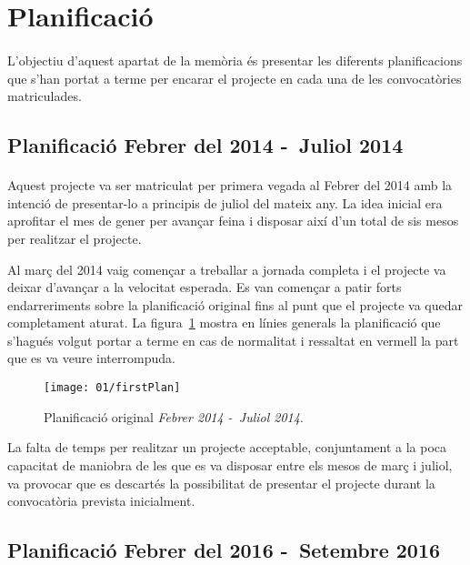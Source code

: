 \section{Planificació}

    \paragraph{}
    L'objectiu d'aquest apartat de la memòria és presentar les diferents planificacions que s'han portat a terme per encarar el projecte en cada una de les convocatòries matriculades.

    \subsection{Planificació Febrer del 2014 -\ Juliol 2014}

        \paragraph{}
        Aquest projecte va ser matriculat per primera vegada al Febrer del 2014 amb la intenció de presentar-lo a principis de juliol del mateix any. La idea inicial era aprofitar el mes de gener per avançar feina i disposar així d’un total de sis mesos per realitzar el projecte.

        Al març del 2014 vaig començar a treballar a jornada completa i el projecte va deixar d’avançar a la velocitat esperada. Es van començar a patir forts endarreriments sobre la planificació original fins al punt que el projecte va quedar completament aturat. La figura~\ref{fig:firstPlan} mostra en línies generals la planificació que s’hagués volgut portar a terme en cas de normalitat i ressaltat en vermell la part que es va veure interrompuda.

        \begin{figure}[h]
                \texttt{[image: 01/firstPlan]}
                \centering
                \caption{Planificació original \emph{Febrer 2014 -\ Juliol 2014}.\label{fig:firstPlan}}
        \end{figure}

        La falta de temps per realitzar un projecte acceptable, conjuntament a la poca capacitat de maniobra de les que es va disposar entre els mesos de març i juliol, va provocar que es descartés la possibilitat de presentar el projecte durant la convocatòria prevista inicialment.

    \subsection{Planificació Febrer del 2016 -\ Setembre 2016}\label{sec:thePlan}

